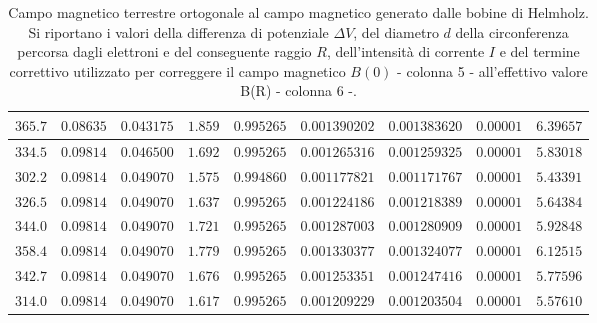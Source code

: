 \documentclass[]{article}
\begin{document}
\begin{table}[H]
\begin{tabular}{||c|c|c|c|c|c|c|c|c||}
        $365.7$ & $0.08635$ & $0.043175$ & $1.859$ & $0.995265$ & $0.001390202$ & $0.001383620$ & $0.00001$ & $6.39657$ \\\hline
        $334.5$ & $0.09814$ & $0.046500$ & $1.692$ & $0.995265$ & $0.001265316$ & $0.001259325$ & $0.00001$ & $5.83018$ \\\hline
        $302.2$ & $0.09814$ & $0.049070$ & $1.575$ & $0.994860$ & $0.001177821$ & $0.001171767$ & $0.00001$ & $5.43391$ \\\hline
        $326.5$ & $0.09814$ & $0.049070$ & $1.637$ & $0.995265$ & $0.001224186$ & $0.001218389$ & $0.00001$ & $5.64384$ \\\hline
        $344.0$ & $0.09814$ & $0.049070$ & $1.721$ & $0.995265$ & $0.001287003$ & $0.001280909$ & $0.00001$ & $5.92848$ \\\hline
        $358.4$ & $0.09814$ & $0.049070$ & $1.779$ & $0.995265$ & $0.001330377$ & $0.001324077$ & $0.00001$ & $6.12515$ \\\hline
        $342.7$ & $0.09814$ & $0.049070$ & $1.676$ & $0.995265$ & $0.001253351$ & $0.001247416$ & $0.00001$ & $5.77596$ \\\hline
        $314.0$ & $0.09814$ & $0.049070$ & $1.617$ & $0.995265$ & $0.001209229$ & $0.001203504$ & $0.00001$ & $5.57610$ \\\hline
    
    \end{tabular}
    \caption{Campo magnetico terrestre ortogonale al campo magnetico generato dalle bobine di Helmholz. Si riportano i valori della differenza di potenziale $\Delta V$, del diametro $ d $ della circonferenza percorsa dagli elettroni e del conseguente raggio $ R $, dell'intensità di corrente $ I $ e del termine correttivo utilizzato per correggere il campo magnetico $B(0)$ - colonna 5 - all'effettivo valore B(R) - colonna 6 -.}
    \label{CM_ortogonale}
\end{table}
\end{document}

